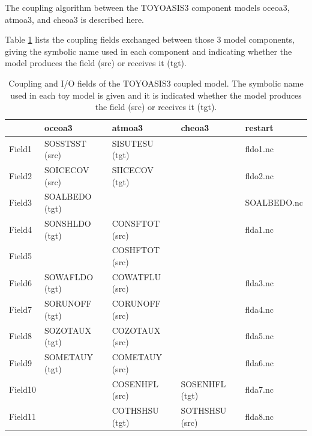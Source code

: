  The coupling algorithm between the TOYOASIS3 component models oceoa3, atmoa3,
 and cheoa3 is described here.
 
Table \ref{tab:couplingIOfields} lists the coupling fields exchanged
between those 3 model components, giving the symbolic name used in
each component and indicating whether the model produces the field
(src) or receives it (tgt).
 
\vspace*{1ex}
\begin{table}[ht]
	\begin{tabularx}{16cm}[t]{|l|l|l|l|X|}
	\hline
	  & 
	 oceoa3 & 
	 atmoa3 & 
	 cheoa3 &
	 restart \\
	\hline\hline
	 Field1 & 
	 SOSSTSST (src) & 
	 SISUTESU (tgt) &
	 & 
	 fldo1.nc \\
	\hline
	 Field2 & 
	 SOICECOV (src) & 
	 SIICECOV (tgt) &
	 & 
	 fldo2.nc \\
	\hline
	 Field3 & 
	 SOALBEDO (tgt) & 
	 & 
	 &
	 SOALBEDO.nc \\
	\hline
         Field4 & 
	 SONSHLDO (tgt) &
	 CONSFTOT (src) &
	 &
	 flda1.nc \\
	\hline
         Field5  &    
         &
	 COSHFTOT (src)&
	 &
	 \\
	\hline
         Field6 &    
         SOWAFLDO (tgt) &
         COWATFLU (src) &
         &
         flda3.nc \\
	\hline    
         Field7 & 
         SORUNOFF (tgt) &
         CORUNOFF (src) &
         &
         flda4.nc \\
	\hline    
         Field8 &
         SOZOTAUX (tgt)&
         COZOTAUX (src)&
         &
         flda5.nc \\
	\hline    
         Field9 &
         SOMETAUY (tgt)&
         COMETAUY (src)&
         &
         flda6.nc \\
	\hline
	 Field10 &
         &
         COSENHFL (src) &
         SOSENHFL (tgt) &
         flda7.nc \\
	 \hline
	 Field11 &
         &
         COTHSHSU (tgt)&
         SOTHSHSU (src) &
         flda8.nc \\
	 \hline	         
	\end{tabularx}
\caption[Coupling and I/O fields of the TOYOASIS3 coupled model]
	{Coupling and I/O fields of the TOYOASIS3 coupled model. The
	symbolic name used in each toy model is given and it is
	indicated whether the model produces the field (src) or
	receives it (tgt). }
\label{tab:couplingIOfields}
\end{table}
\vspace*{1ex}

